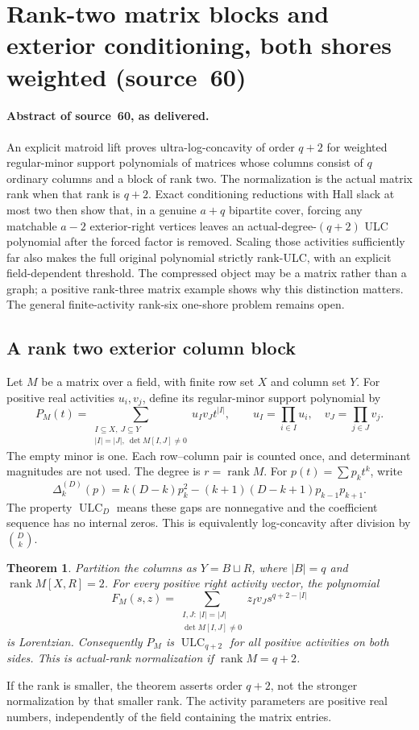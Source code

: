 \documentclass[11pt,a4paper]{article}
\newtheorem{theorem}{Theorem}[section]
\theoremstyle{remark}\newtheorem{remark}[theorem]{Remark}
\newcommand{\ULC}{\operatorname{ULC}}      %
\newcommand{\gap}{\Delta}                  %
\newcommand{\rank}{\operatorname{rank}}    %
\begin{document}
\section{Rank-two matrix blocks and exterior conditioning, both shores weighted (source~60)}\label{mrn:src:60}
\paragraph{Abstract of source~60, as delivered.} An explicit matroid lift proves ultra-log-concavity of order $q+2$ for weighted regular-minor support polynomials of matrices whose columns consist of $q$ ordinary columns and a block of rank two. The normalization is the actual matrix rank when that rank is $q+2$. Exact conditioning reductions with Hall slack at most two then show that, in a genuine $a+q$ bipartite cover, forcing any matchable $a-2$ exterior-right vertices leaves an actual-degree-$(q+2)$ ULC polynomial after the forced factor is removed. Scaling those activities sufficiently far also makes the full original polynomial strictly rank-ULC, with an explicit field-dependent threshold. The compressed object may be a matrix rather than a graph; a positive rank-three matrix example shows why this distinction matters. The general finite-activity rank-six one-shore problem remains open.

\subsection{A rank two exterior column block}
Let $M$ be a matrix over a field, with finite row set $X$ and column set $Y$. For positive real activities $u_i,v_j$, define its regular-minor support polynomial by
\[
 P_M(t)=\sum_{\substack{I\subseteq X,\ J\subseteq Y\\|I|=|J|,\ \det M[I,J]\ne0}}
 u_Iv_Jt^{|I|},\qquad u_I=\prod_{i\in I}u_i,
 \quad v_J=\prod_{j\in J}v_j.
\]
The empty minor is one. Each row--column pair is counted once, and determinant magnitudes are not used. The degree is $r=\rank M$. For $p(t)=\sum p_kt^k$, write
\[
 \gap_k^{(D)}(p)=k(D-k)p_k^2-(k+1)(D-k+1)p_{k-1}p_{k+1}.
\]
The property $\ULC_D$ means these gaps are nonnegative and the coefficient sequence has no internal zeros. This is equivalently log-concavity after division by $\binom Dk$.

\begin{theorem}\label{mrn:s:rb:thm:matrix}
Partition the columns as $Y=B\sqcup R$, where $|B|=q$ and $\rank M[X,R]=2$. For every positive right activity vector, the polynomial
\begin{equation}\label{mrn:s:rb:eq:leftmarginal}
 F_M(s,z)=\sum_{\substack{I,J:\ |I|=|J|\\\det M[I,J]\ne0}}
 z_Iv_Js^{q+2-|I|}
\end{equation}
is Lorentzian. Consequently $P_M$ is $\ULC_{q+2}$ for all positive activities on both sides. This is actual-rank normalization if $\rank M=q+2$.
\end{theorem}
If the rank is smaller, the theorem asserts order $q+2$, not the stronger normalization by that smaller rank. The activity parameters are positive real numbers, independently of the field containing the matrix entries.
\end{document}
